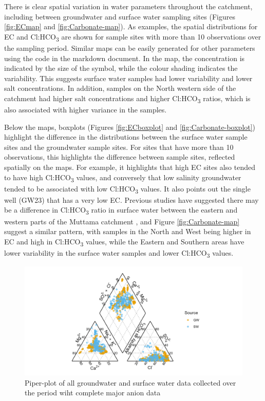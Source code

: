 \documentclass[, manuscript]{copernicus}
\begin{document}
There is clear spatial variation in water parameters throughout the
catchment, including between groundwater and surface water sampling
sites (Figures \ref{fig:ECmap} and \ref{fig:Carbonate-map}). As
examples, the spatial distributions for EC and Cl:HCO\textsubscript{3}
are shown for sample sites with more than 10 observations over the
sampling period. Similar maps can be easily generated for other
parameters using the code in the markdown document. In the map, the
concentration is indicated by the size of the symbol, while the colour
shading indicates the variability. This suggests surface water samples
had lower variability and lower salt concentrations. In addition,
samples on the North western side of the catchment had higher salt
concentrations and higher Cl:HCO\textsubscript{3} ratios, which is also
associated with higher variance in the samples.

Below the maps, boxplots (Figures \ref{fig:ECboxplot} and
\ref{fig:Carbonate-boxplot}) highlight the difference in the
distributions between the surface water sample sites and the groundwater
sample sites. For sites that have more than 10 observations, this
highlights the difference between sample sites, reflected spatially on
the maps. For example, it highlights that high EC sites also tended to
have high Cl:HCO\textsubscript{3} values, and conversely that low
salinity groundwater tended to be associated with low
Cl:HCO\textsubscript{3} values. It also points out the single well
(GW23) that has a very low EC. Previous studies have suggested there may
be a difference in Cl:HCO\textsubscript{3} ratio in surface water
between the eastern and western parts of the Muttama catchment
\citep{Conyers2008}, and Figure \ref{fig:Carbonate-map} suggest a
similar pattern, with samples in the North and West being higher in EC
and high in Cl:HCO\textsubscript{3} values, while the Eastern and
Southern areas have lower variability in the surface water samples and
lower Cl:HCO\textsubscript{3} values.

\begin{figure}
\includegraphics[width=0.8\linewidth]{Figures/piper_plot} \caption{Piper-plot of all groundwater and surface water data collected over the period wiht complete major anion data}\label{fig:piperplot}
\end{figure}
\end{document}
